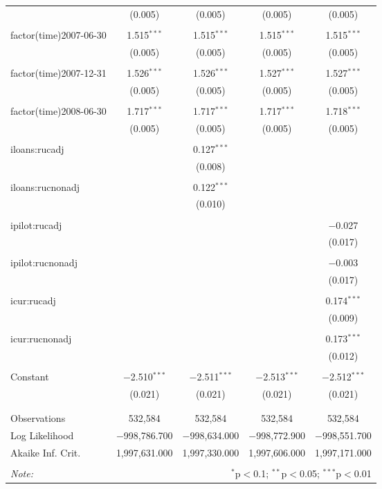 \begin{table}[!htbp]
\begin{tabular}{@{\extracolsep{5pt}}lcccc}
  & (0.005) & (0.005) & (0.005) & (0.005) \\ 
  & & & & \\ 
 factor(time)2007-06-30 & 1.515$^{***}$ & 1.515$^{***}$ & 1.515$^{***}$ & 1.515$^{***}$ \\ 
  & (0.005) & (0.005) & (0.005) & (0.005) \\ 
  & & & & \\ 
 factor(time)2007-12-31 & 1.526$^{***}$ & 1.526$^{***}$ & 1.527$^{***}$ & 1.527$^{***}$ \\ 
  & (0.005) & (0.005) & (0.005) & (0.005) \\ 
  & & & & \\ 
 factor(time)2008-06-30 & 1.717$^{***}$ & 1.717$^{***}$ & 1.717$^{***}$ & 1.718$^{***}$ \\ 
  & (0.005) & (0.005) & (0.005) & (0.005) \\ 
  & & & & \\ 
 iloans:rucadj &  & 0.127$^{***}$ &  &  \\ 
  &  & (0.008) &  &  \\ 
  & & & & \\ 
 iloans:rucnonadj &  & 0.122$^{***}$ &  &  \\ 
  &  & (0.010) &  &  \\ 
  & & & & \\ 
 ipilot:rucadj &  &  &  & $-$0.027 \\ 
  &  &  &  & (0.017) \\ 
  & & & & \\ 
 ipilot:rucnonadj &  &  &  & $-$0.003 \\ 
  &  &  &  & (0.017) \\ 
  & & & & \\ 
 icur:rucadj &  &  &  & 0.174$^{***}$ \\ 
  &  &  &  & (0.009) \\ 
  & & & & \\ 
 icur:rucnonadj &  &  &  & 0.173$^{***}$ \\ 
  &  &  &  & (0.012) \\ 
  & & & & \\ 
 Constant & $-$2.510$^{***}$ & $-$2.511$^{***}$ & $-$2.513$^{***}$ & $-$2.512$^{***}$ \\ 
  & (0.021) & (0.021) & (0.021) & (0.021) \\ 
  & & & & \\ 
\hline \\[-1.8ex] 
Observations & 532,584 & 532,584 & 532,584 & 532,584 \\ 
Log Likelihood & $-$998,786.700 & $-$998,634.000 & $-$998,772.900 & $-$998,551.700 \\ 
Akaike Inf. Crit. & 1,997,631.000 & 1,997,330.000 & 1,997,606.000 & 1,997,171.000 \\ 
\hline 
\hline \\[-1.8ex] 
\textit{Note:}  & \multicolumn{4}{r}{$^{*}$p$<$0.1; $^{**}$p$<$0.05; $^{***}$p$<$0.01} \\ 
\end{tabular} 
\end{table} 
